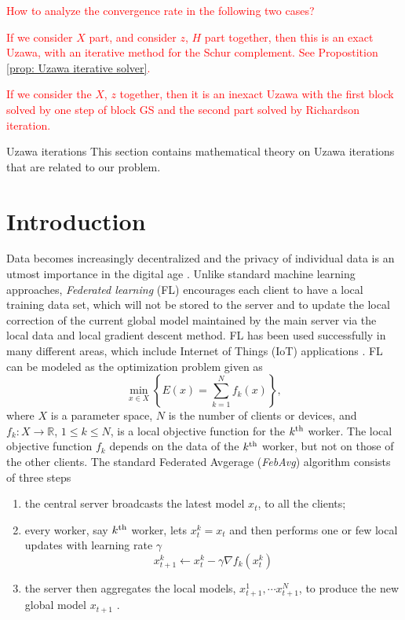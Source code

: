 \textcolor{red}{How to analyze the convergence rate in the following two cases?}

\textcolor{red}{If we consider $X$ part, and consider $z$, $H$ part together, then this is an exact Uzawa, with an iterative method for the Schur complement. See Propostition \ref{prop: Uzawa iterative solver}. }

\textcolor{red}{If we consider the $X$, $z$ together, then it is an inexact Uzawa with the first block solved by one step of block GS and the second part solved by Richardson iteration.}


\newpage 

\begin{section}{Uzawa iterations}
This section contains mathematical theory on Uzawa iterations that are related to our problem. 
\end{section}

\section{Introduction}

Data becomes increasingly decentralized and the privacy of individual data is an utmost importance in the digital age \cite{house2012consumer, cai2021deepstroke,chen2020ai,luo2020arbee,wang2020panel}. Unlike standard machine learning approaches, \textit{Federated learning} (FL) encourages each client to have a local training data set, which will not be stored to the server and  to update the local correction of the current global model maintained by the main server via the local data and local gradient descent method. {FL} has been used successfully in many different areas, which include Internet of Things (IoT) applications \cite{hwang2015iot, ferrag2021federated}. {FL} can be modeled as the optimization problem given as 
\begin{equation}\label{FL}
\min_{x \in X} \left \{ E(x) = \sum_{k=1}^N f_k (x) \right \},
\end{equation} 
where $X$ is a parameter space, $N$ is the number of clients or devices, and $f_k \colon X \rightarrow \mathbb{R}$, $1 \leq k \leq N$, is a local objective function for the $k^{\rm th}$ worker. The local objective function $f_k$ depends on the data of the $k^{\rm th}$ worker, but not on those of the other clients. The standard Federated Avgerage ({\textit{FebAvg}}) algorithm consists of three steps
\begin{enumerate}
\item  the central server broadcasts the latest model $x_t$, to all the clients;
\item every worker, say $k^{\rm th}$ worker, lets $x_t^k = x_t$ and then performs one or few local updates with learning rate $\gamma$ 
  $$x_{t+1}^k \leftarrow x_t^k - \gamma \nabla f_k(x_t^k)$$
\item the server then aggregates the local models, $x_{t+1}^1, \cdots x_{t+1}^N$, to produce the new global model $x_{t+1}$ \cite{konevcny2016federated}.
  \end{enumerate}

